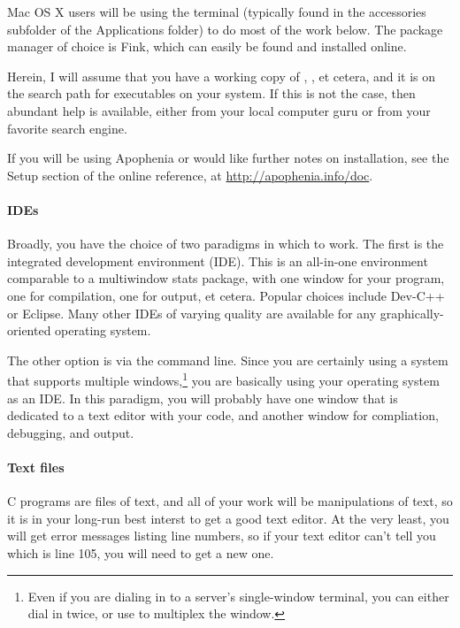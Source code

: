 \documentclass[12pt]{article}
\def\ind#1{\index{#1}#1}
\begin{document}
Mac OS X users will be using the terminal (typically found in the
accessories subfolder of the Applications folder) to do most of the
work below. The package manager of choice is Fink, which can easily be
found and installed online.

Herein, I will assume that you have a working copy of ,
, et cetera, and it is on the search path for executables
on your system. If this is not the case, then abundant help is available,
either from your local computer guru or from your favorite search engine.

If you will be using Apophenia or would like further notes on
installation, see the Setup section of the online reference, at
\url{http://apophenia.info/doc}.

\paragraph{IDEs}  
Broadly, you have the choice of two paradigms in which to work. The
first is the integrated development environment (IDE). This is an
all-in-one environment comparable to a multiwindow stats package, with
one window for your program, one for compilation, one for output, et
cetera.  
Popular choices include Dev-C++ or Eclipse. Many other IDEs of varying
quality are available for any graphically-oriented operating system.

The other option is via the command line. Since you are certainly using
a system that supports multiple windows,\footnote{Even if you are
dialing in to a server's single-window terminal, you can either dial in
twice, or use  to multiplex the window.} 
you are basically using your operating system as an IDE.
In this paradigm, you will probably have one window that is dedicated to
a text editor with your code, and another window for compliation,
debugging, and output.



\paragraph{Text files} C programs are files of text, and all of your work
will be manipulations of text, so it is in your long-run best interst to
get a good \ind{text editor}. At the very least, you will get error messages
listing line numbers, so if your text editor can't tell you which is
line 105, you will need to get a new one.
\end{document}
